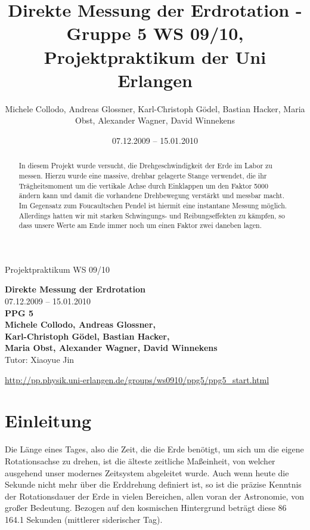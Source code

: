 \documentclass[halfparskip, 11pt]{scrartcl}
\title{Direkte Messung der Erdrotation - Gruppe 5 WS 09/10, Projektpraktikum der Uni Erlangen}
\date{07.12.2009 -- 15.01.2010}
\author{Michele Collodo, Andreas Glossner, Karl-Christoph G\"odel, Bastian Hacker, Maria Obst, Alexander Wagner, David Winnekens}
\begin{document}
\sloppy %
\thispagestyle{empty}
\large{Projektpraktikum WS 09/10}
\hfill
{}
\\[8\baselineskip]
\begin{center}
{\fontsize{36}{54}\textbf{Direkte Messung der Erdrotation}}
\\[2\baselineskip]
{\Large 07.12.2009 -- 15.01.2010}
\\[7\baselineskip]
{\huge\textbf{PPG 5}}
\\[0.5\baselineskip]
{\large\textbf{
Michele Collodo,
Andreas Glossner,\\
Karl-Christoph G\"odel,
Bastian Hacker,\\
Maria Obst,
Alexander Wagner,
David Winnekens}\\
Tutor: Xiaoyue Jin}
\vfill



\small{\url{http://pp.physik.uni-erlangen.de/groups/ws0910/ppg5/ppg5\_start.html}}
\end{center}
\newpage



\tableofcontents
\vfill



\begin{abstract}
In diesem Projekt wurde versucht, die Drehgeschwindigkeit der Erde im Labor zu messen.
Hierzu wurde eine massive, drehbar gelagerte Stange verwendet, die ihr Trägheitsmoment um die vertikale Achse durch Einklappen um den Faktor 5000 ändern kann und damit die vorhandene Drehbewegung verstärkt und messbar macht.
Im Gegensatz zum Foucaultschen Pendel ist hiermit eine instantane Messung möglich.
Allerdings hatten wir mit starken Schwingungs- und Reibungseffekten zu kämpfen, so dass unsere Werte am Ende immer noch um einen Faktor zwei daneben lagen.
\end{abstract}
\newpage

\section{Einleitung} %
Die Länge eines Tages, also die Zeit, die die Erde benötigt, um sich um die eigene Rotationsachse zu drehen, ist die älteste zeitliche Maßeinheit, von welcher ausgehend unser modernes Zeitsystem abgeleitet wurde. Auch wenn heute die Sekunde nicht mehr über die Erddrehung definiert ist, so ist die präzise Kenntnis der Rotationsdauer der Erde in vielen Bereichen, allen voran der Astronomie, von großer Bedeutung. Bezogen auf den kosmischen Hintergrund beträgt diese 86\,164.1 Sekunden (mittlerer siderischer Tag).
\end{document}
